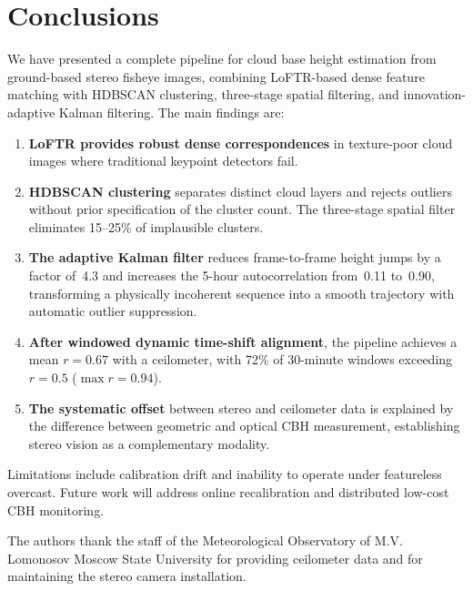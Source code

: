 \documentclass[preprint,
superscriptaddress,
amsmath,amssymb,aps,
twoside,final,secnumarabic,
nofootinbib]{revtex4-2}
\begin{document}
\section{Conclusions}\label{sec:conclusions}

We have presented a complete pipeline for cloud base height estimation from ground-based stereo fisheye images, combining LoFTR-based dense feature matching with HDBSCAN clustering, three-stage spatial filtering, and innovation-adaptive Kalman filtering. The main findings are:

\begin{enumerate}
\item \textbf{LoFTR provides robust dense correspondences} in texture-poor cloud images where traditional keypoint detectors fail.

\item \textbf{HDBSCAN clustering} separates distinct cloud layers and rejects outliers without prior specification of the cluster count. The three-stage spatial filter eliminates 15--25\% of implausible clusters.

\item \textbf{The adaptive Kalman filter} reduces frame-to-frame height jumps by a factor of~4.3 and increases the 5-hour autocorrelation from~0.11 to~0.90, transforming a physically incoherent sequence into a smooth trajectory with automatic outlier suppression.

\item \textbf{After windowed dynamic time-shift alignment}, the pipeline achieves a mean $r = 0.67$ with a ceilometer, with 72\% of 30-minute windows exceeding $r = 0.5$ ($\max r = 0.94$).

\item \textbf{The systematic offset} between stereo and ceilometer data is explained by the difference between geometric and optical CBH measurement, establishing stereo vision as a complementary modality.
\end{enumerate}

Limitations include calibration drift and inability to operate under featureless overcast. Future work will address online recalibration and distributed low-cost CBH monitoring.

\begin{acknowledgments}
The authors thank the staff of the Meteorological Observatory of M.V. Lomonosov Moscow State University for providing ceilometer data and for maintaining the stereo camera installation.
\end{acknowledgments}
\end{document}
